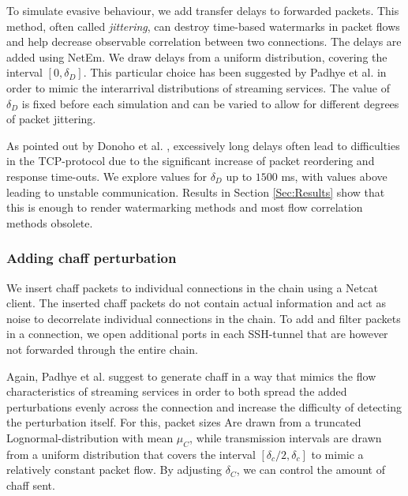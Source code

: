\documentclass[runningheads,11pt]{llncs}\usepackage[]{graphicx}\usepackage[]{color}
\begin{document}
To simulate evasive behaviour, we add transfer delays to forwarded packets. This method, often called \textit{jittering}, can destroy time-based watermarks in packet flows and help decrease observable correlation between two connections. The delays are added using NetEm. We draw delays from a uniform distribution, covering the interval $[0,\delta_D]$. This particular choice has been suggested by Padhye et al. \cite{padhye2010evading} in order to mimic the interarrival distributions of streaming services. The value of $\delta_D$ is fixed before each simulation and can be varied to allow for different degrees of packet jittering.

As pointed out by Donoho et al. \cite{donoho2002multiscale}, excessively long delays often lead to difficulties in the TCP-protocol due to the significant increase of packet reordering and response time-outs. We explore values for $\delta_D$ up to $1500$ ms, with values above leading to unstable communication. Results in Section \ref{Sec:Results} show that this is enough to render watermarking methods and most flow correlation methods obsolete.%



\subsubsection{Adding chaff perturbation}\label{Sec:chaff_desc}

We insert chaff packets to individual connections in the chain using a Netcat client. The inserted chaff packets do not contain actual information and act as noise to decorrelate individual connections in the chain. To add and filter packets in a connection, we open additional ports in each SSH-tunnel that are however not forwarded through the entire chain. %



Again,  Padhye et al. \cite{padhye2010evading} suggest to generate chaff in a way that mimics the flow characteristics of streaming services in order to both spread the added perturbations evenly across the connection and increase the difficulty of detecting the perturbation itself.
For this, packet sizes Are drawn from a truncated Lognormal-distribution with mean $\mu_C$, while transmission intervals are drawn from a uniform distribution that covers the interval $[\delta_c/2,\delta_c]$ to mimic a relatively constant packet flow. By adjusting $\delta_C$, we can control the amount of chaff sent. 
\end{document}
